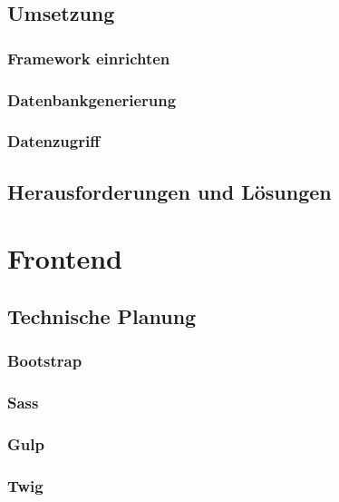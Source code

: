   \subsection{Umsetzung}
  
    \subsubsection{Framework einrichten}

    \subsubsection{Datenbankgenerierung}

    \subsubsection{Datenzugriff}

  \subsection{Herausforderungen und Lösungen}

\section{Frontend}

  \subsection{Technische Planung}

    \subsubsection{Bootstrap}

    \subsubsection{Sass}

    \subsubsection{Gulp}

    \subsubsection{Twig}

